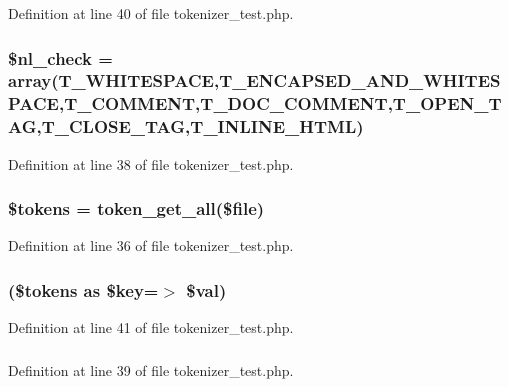 \-Definition at line 40 of file tokenizer\-\_\-test.\-php.

\hypertarget{tokenizer__test_8php_a906bfa5b99948cfe33ed4aaf8902a00f}{
\subsubsection[{\$nl\-\_\-check}]{\setlength{\rightskip}{0pt plus 5cm}\$nl\-\_\-check = array(\-T\-\_\-\-W\-H\-I\-T\-E\-S\-P\-A\-C\-E,\-T\-\_\-\-E\-N\-C\-A\-P\-S\-E\-D\-\_\-\-A\-N\-D\-\_\-\-W\-H\-I\-T\-E\-S\-P\-A\-C\-E,\-T\-\_\-\-C\-O\-M\-M\-E\-N\-T,\-T\-\_\-\-D\-O\-C\-\_\-\-C\-O\-M\-M\-E\-N\-T,\-T\-\_\-\-O\-P\-E\-N\-\_\-\-T\-A\-G,\-T\-\_\-\-C\-L\-O\-S\-E\-\_\-\-T\-A\-G,\-T\-\_\-\-I\-N\-L\-I\-N\-E\-\_\-\-H\-T\-M\-L)}}\label{tokenizer__test_8php_a906bfa5b99948cfe33ed4aaf8902a00f}


\-Definition at line 38 of file tokenizer\-\_\-test.\-php.

\hypertarget{tokenizer__test_8php_a72ead29e4317fbc4335fd3ba764e8b59}{
\subsubsection[{\$tokens}]{\setlength{\rightskip}{0pt plus 5cm}\$tokens = token\-\_\-get\-\_\-all(\$file)}}\label{tokenizer__test_8php_a72ead29e4317fbc4335fd3ba764e8b59}


\-Definition at line 36 of file tokenizer\-\_\-test.\-php.

\hypertarget{tokenizer__test_8php_abda7d0bba3f9720b725f14f620cd4fd6}{
\subsubsection[{foreach}]{(\$tokens as \$key=$>$ \$val)}}\label{tokenizer__test_8php_abda7d0bba3f9720b725f14f620cd4fd6}


\-Definition at line 41 of file tokenizer\-\_\-test.\-php.

\hypertarget{tokenizer__test_8php_a3ad3a4240c0f97c7e85aff5c52a454d4}{
\subsubsection[{print}]{}}\label{tokenizer__test_8php_a3ad3a4240c0f97c7e85aff5c52a454d4}


\-Definition at line 39 of file tokenizer\-\_\-test.\-php.


